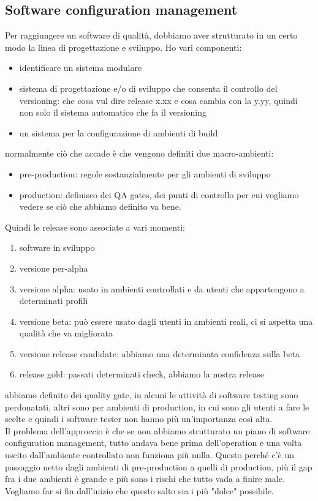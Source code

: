 \documentclass{article}
\begin{document}
\subsection{Software configuration management}
Per raggiungere un software di qualità, dobbiamo aver strutturato in un certo modo la linea di progettazione e sviluppo. Ho vari componenti:
\begin{itemize}
\item identificare un sistema modulare
\item sistema di progettazione e/o di sviluppo che consenta il controllo del versioning: che cosa vul dire release x.xx e cosa cambia con la y.yy, quindi non solo il sistema automatico che fa il versioning
\item un sistema per la configurazione di ambienti di build
\end{itemize}
normalmente ciò che accade è che vengono definiti due macro-ambienti:
\begin{itemize}
\item pre-production: regole sostanzialmente per gli ambienti di sviluppo
\item production: definisco dei QA gates, dei punti di controllo per cui vogliamo vedere se ciò che abbiamo definito va bene.
\end{itemize}
Quindi le release sono associate a vari momenti:
\begin{enumerate}
\item software in sviluppo
\item versione per-alpha
\item versione alpha: usato in ambienti controllati e da utenti che appartengono a determinati profili
\item versione beta: può essere usato dagli utenti in ambienti reali, ci si aspetta una qualità che va migliorata
\item versione release candidate: abbiamo una determinata confidenza sulla beta
\item release gold: passati determinati check, abbiamo la nostra release
\end{enumerate}
abbiamo definito dei quality gate, in alcuni le attività di software testing sono perdonatati, altri sono per ambienti di production, in cui sono gli utenti a fare le scelte e quindi i software tester non hanno più un'importanza così alta.\\ Il problema dell'approccio è che se non abbiamo strutturato un piano di software configuration management, tutto andava bene prima dell'operation e una volta uscito dall'ambiente controllato non funziona più nulla. Questo perché c'è un passaggio netto dagli ambienti di pre-production a quelli di production, più il gap fra i due ambienti è grande e più sono i rischi che tutto vada a finire male. Vogliamo far si fin dall'inizio che questo salto sia i più "dolce" possibile.
\end{document}
